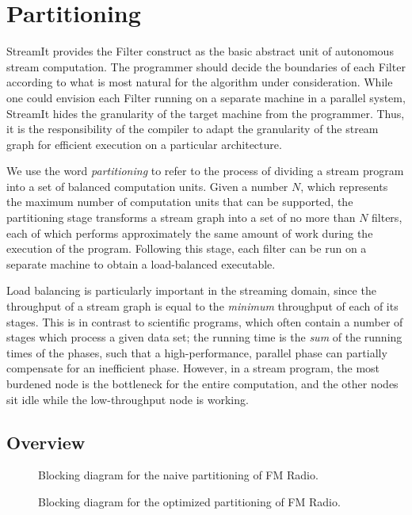 \section{Partitioning}

StreamIt provides the Filter construct as the basic abstract unit of
autonomous stream computation.  The programmer should decide the
boundaries of each Filter according to what is most natural for the
algorithm under consideration.  While one could envision each Filter
running on a separate machine in a parallel system, StreamIt hides the
granularity of the target machine from the programmer.  Thus, it is
the responsibility of the compiler to adapt the granularity of the
stream graph for efficient execution on a particular architecture.

We use the word {\it partitioning} to refer to the process of dividing
a stream program into a set of balanced computation units.  Given a
number $N$, which represents the maximum number of computation units
that can be supported, the partitioning stage transforms a stream
graph into a set of no more than $N$ filters, each of which performs
approximately the same amount of work during the execution of the
program.  Following this stage, each filter can be run on a separate
machine to obtain a load-balanced executable.  

Load balancing is particularly important in the streaming domain,
since the throughput of a stream graph is equal to the {\it minimum}
throughput of each of its stages.  This is in contrast to scientific
programs, which often contain a number of stages which process a given
data set; the running time is the {\it sum} of the running times of
the phases, such that a high-performance, parallel phase can partially
compensate for an inefficient phase.  However, in a stream program,
the most burdened node is the bottleneck for the entire computation,
and the other nodes sit idle while the low-throughput node is working.

\subsection{Overview}

\begin{figure}[t]
\vspace{-6pt}
\begin{minipage}{3.1in}
\vspace{-12pt}
\caption{\protect\small Blocking diagram for the naive partitioning of
 FM Radio.
\protect\label{fig:fmblood1}}
\end{minipage}
\hspace{0.3in}
\vspace{-12pt}
\begin{minipage}{3.1in}
\caption{\protect\small Blocking diagram for the optimized
partitioning of FM Radio.
\protect\label{fig:fmblood2}}
\end{minipage}
\vspace{-6pt}
\end{figure}

